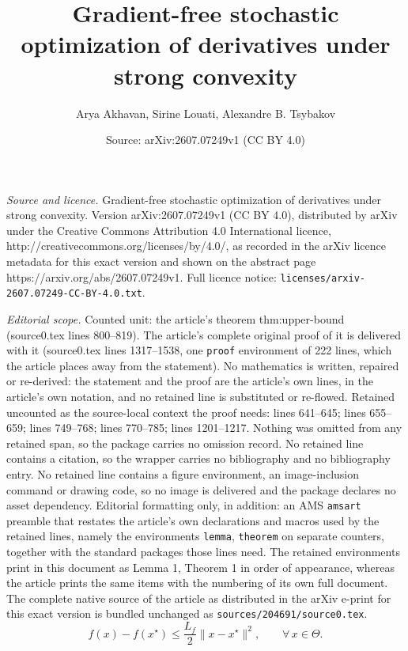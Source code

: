 \documentclass[10pt,a4paper]{amsart}
\title{Gradient-free stochastic optimization of derivatives under strong convexity}
\author{Arya Akhavan, Sirine Louati, Alexandre B. Tsybakov}
\date{Source: arXiv:2607.07249v1 (CC BY 4.0)}
\renewcommand{\leq}{\leqslant}
\begin{document}
\maketitle

\noindent\emph{Source and licence.} Gradient-free stochastic optimization of derivatives under strong convexity. Version arXiv:2607.07249v1 (CC BY 4.0), distributed by arXiv under the Creative Commons Attribution 4.0 International licence, http://creativecommons.org/licenses/by/4.0/, as recorded in the arXiv licence metadata for this exact version and shown on the abstract page https://arxiv.org/abs/2607.07249v1. Full licence notice: \texttt{licenses/arxiv-2607.07249-CC-BY-4.0.txt}.\par\smallskip

\noindent\textit{Editorial scope.} Counted unit: the article's theorem thm:upper-bound (source0.tex lines 800--819). The article's complete original proof of it is delivered with it (source0.tex lines 1317--1538, one \texttt{proof} environment of 222 lines, which the article places away from the statement). No mathematics is written, repaired or re-derived: the statement and the proof are the article's own lines, in the article's own notation, and no retained line is substituted or re-flowed.  Retained uncounted as the source-local context the proof needs: lines 641--645; lines 655--659; lines 749--768; lines 770--785; lines 1201--1217.  Nothing was omitted from any retained span, so the package carries no omission record.  No retained line contains a citation, so the wrapper carries no bibliography and no bibliography entry.  No retained line contains a figure environment, an image-inclusion command or drawing code, so no image is delivered and the package declares no asset dependency.  Editorial formatting only, in addition: an AMS \texttt{amsart} preamble that restates the article's own declarations and macros used by the retained lines, namely the environments \texttt{lemma}, \texttt{theorem} on separate counters, together with the standard packages those lines need.  The retained environments print in this document as Lemma 1, Theorem 1 in order of appearance, whereas the article prints the same items with the numbering of its own full document.  The complete native source of the article as distributed in the arXiv e-print for this exact version is bundled unchanged as \texttt{sources/204691/source0.tex}.
\begin{equation}
\label{eq:smoothness}
f(x)-f(x^\star)\leq\frac{L_f}{2}\|x-x^\star\|^2,
\qquad\forall\,x\in\Theta.
\end{equation}
\end{document}
